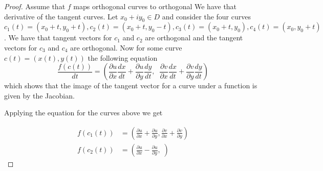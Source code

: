 \documentclass[letter,12pt]{article}
\begin{document}
    \begin{proof}
        Assume that $f$ maps orthogonal curves to orthogonal We have that derivative of the tangent curves. Let $x_0+iy_0\in D$ and consider the four curves $c_1(t)=(x_0+t,y_0+t), c_2(t)=(x_0+t,y_0-t), c_3(t)=(x_0+t,y_0) ,c_4(t)=(x_0,y_0+t)$. We have that tangent vectors for $c_1$ and $c_2$ are orthogonal and the tangent vectors for $c_3$ and $c_4$ are orthogonal. Now for some curve $c(t)=(x(t),y(t))$ the following equation  $$\frac{ f( c(t))}{dt}=(\frac{\partial u}{\partial x}\frac{dx}{dt}+\frac{\partial u}{\partial y}\frac{dy}{dt},\;\;\frac{\partial v}{\partial x}\frac{dx}{dt}+\frac{\partial v}{\partial y}\frac{dy}{dt})$$
        which shows that the image of the tangent vector for a curve under a function is given by the Jacobian.

        Applying the equation for the curves above we get 

        \begin{align*}
            f(c_1(t)) &= (\frac{\partial u}{\partial x}+\frac{\partial u}{\partial y}, \frac{\partial v}{\partial x}+\frac{\partial v}{\partial y}) \\
            f(c_2(t)) &= (\frac{\partial u}{\partial x}-\frac{\partial u}{\partial y}, \;)
        \end{align*}
        



    \end{proof}
\end{document}
